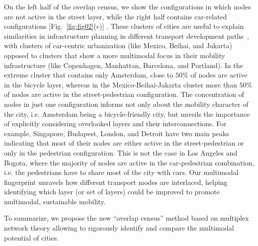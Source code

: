 On the left half of the overlap census, we show the configurations in which nodes are not active in the street layer, while the right half contains car-related configurations [Fig.~\ref{fig:fig02}(c)] . These clusters of cities are useful to explain similarities in infrastructure planning in different transport development paths~\cite{Rodrigue2013Geography,Louf2014Typology}, with clusters of car-centric urbanization (like Mexico, Beihai, and Jakarta) opposed to clusters that show a more multimodal focus in their mobility infrastructure (like Copenhagen, Manhattan, Barcelona, and Portland). In the extreme cluster that contains only Amsterdam, close to $50\%$ of nodes are active in the bicycle layer, whereas in the Mexico-Beihai-Jakarta cluster more than $50\%$ of nodes are active in the street-pedestrian configuration. The concentration of nodes in just one configuration informs not only about the mobility character of the city, i.e. Amsterdam being a bicycle-friendly city, but unveils the importance of explicitly considering overlooked layers and their interconnections. For example, Singapore, Budapest, London, and Detroit have two main peaks indicating that most of their nodes are either active in the street-pedestrian or only in the pedestrian configuration. This is not the case in Los Angeles and Bogota, where the majority of nodes are active in the car-pedestrian combination, i.e. the pedestrians have to share most of the city with cars. Our multimodal fingerprint unravels how different transport modes are interlaced, helping identifying which layer (or set of layers) could be improved to promote multimodal, sustainable mobility.

To summarize, we propose the new ``overlap census'' method based on multiplex network theory allowing to rigorously identify and compare the multimodal potential of cities.
